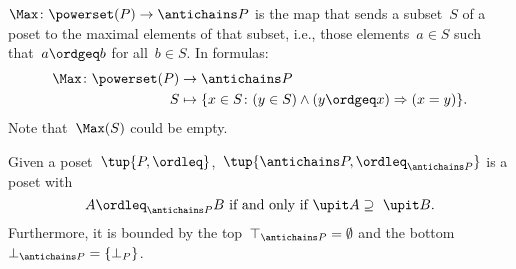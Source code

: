 \begin{definition}[Max]
    \label{def:Max}
    $\Max \colon \powerset(P) \to \antichains P$ is the map that sends a subset~$S$ of a poset to the maximal elements of that subset, i.e., those elements~$a \in S$ such that~$a \ordgeq b$ for all~$b \in S$. In formulas:
    \begin{equation*}
        \begin{aligned}
            \Max \colon \powerset(P) &\to \antichains P\\
            S&\mapsto \{ x\in S\colon (y\in S)\wedge(y\ordgeq x)\Rightarrow (x=y)\}.
        \end{aligned}
    \end{equation*}
    Note that~$\Max(S)$ could be empty.
\end{definition}


\begin{lemma}
    Given a poset~$\tup{P,\ordleq}$,~$\tup{\antichains P,\ordleq_{\antichains P}}$ is a poset with
    \begin{equation}
        \label{eq:orderantichain}
        A\ordleq_{\antichains P} B \text{ if and only if } \upit  A \supseteq \ \upit  B.
    \end{equation}
    Furthermore, it is bounded by the top~$\top_{\antichains P}=\emptyset$ and the bottom~$\bot_{\antichains P}=\{\bot_P\}$.
\end{lemma}

